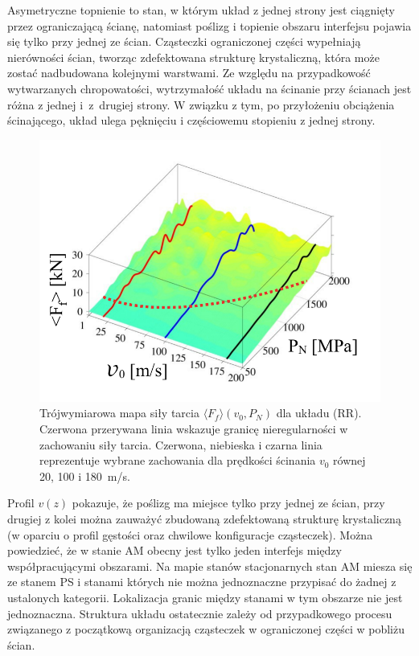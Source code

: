 \documentclass[12pt,a4paper,openright]{report} %
\begin{document}
Asymetryczne topnienie to stan, w którym układ z jednej strony jest ciągnięty przez ograniczającą ścianę, natomiast poślizg i topienie obszaru interfejsu pojawia się tylko przy jednej ze ścian. Cząsteczki ograniczonej części wypełniają nierówności ścian, tworząc zdefektowana strukturę krystaliczną, która może zostać nadbudowana kolejnymi warstwami. Ze względu na przypadkowość wytwarzanych chropowatości, wytrzymałość układu na ścinanie przy ścianach jest różna z jednej i~z~drugiej strony. W związku z tym, po przyłożeniu obciążenia ścinającego, układ ulega pęknięciu i częściowemu stopieniu z jednej strony. 
\begin{figure}[t]
\centering
\includegraphics[width=120mm]{rysunki/sila_t_RR.pdf}
\caption{Trójwymiarowa mapa siły tarcia $\langle F_f \rangle(v_0, P_N)$ dla układu (RR). Czerwona przerywana linia wskazuje granicę nieregularności w zachowaniu siły tarcia. Czerwona, niebieska i czarna linia reprezentuje wybrane zachowania dla prędkości ścinania $v_0$ równej 20, 100 i 180~m/s.}
\label{sila_tarcia_RR}
\end{figure}
Profil $v(z)$ pokazuje, że poślizg ma miejsce tylko przy jednej ze ścian, przy drugiej z kolei można zauważyć zbudowaną zdefektowaną strukturę krystaliczną (w oparciu o profil gęstości oraz chwilowe konfiguracje cząsteczek). Można powiedzieć, że w stanie AM obecny jest tylko jeden interfejs między współpracującymi obszarami. Na mapie stanów stacjonarnych stan AM miesza się ze stanem PS i stanami których nie można jednoznaczne przypisać do żadnej z ustalonych kategorii. Lokalizacja granic między stanami w tym obszarze nie jest jednoznaczna. Struktura układu ostatecznie zależy od przypadkowego procesu związanego z początkową organizacją cząsteczek w ograniczonej części w pobliżu ścian.\\
\end{document}

